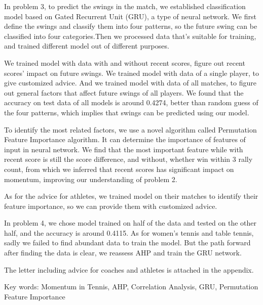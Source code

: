 In problem 3, to predict the swings in the match, we established classification model based on Gated Recurrent Unit (GRU),
a type of neural network.
We first define the swings and classify them into four patterns, so the future swing can be classified into
four categories.Then we processed data that's suitable for training, and trained different model out of different purposes.

We trained model with data with and without recent scores, figure out recent scores' impact on future swings.
We trained model with data of a single player, to give customized advice.
And we trained model with data of all matches, to figure out general factors that affect future swings of all players.
We found that the accuracy on test data of all models is around 0.4274, better than random guess of the four patterns,
which implies that swings can be predicted using our model.

To identify the most related factors, we use a novel algorithm called Permutation Feature Importance algorithm.
It can determine the importance of features of input in neural network. We find that the most important feature while
with recent score is still the score difference, and without, whether win within 3 rally count,
from which we inferred that recent scores has significant impact on momentum,
improving our understanding of problem 2.

As for the advice for athletes, we trained model on their matches to identify their feature importance,
so we can provide them with customized advice.

In problem 4, we chose model trained on half of the data and tested on the other half, and the accuracy is around 0.4115.
As for women's tennis and table tennis, sadly we failed to find abundant data to train the model.
But the path forward after finding the data is clear, we reassess AHP and train the GRU network.

The letter including advice for coaches and athletes is attached in the appendix.

Key words: Momentum in Tennis, AHP, Correlation Analysis, GRU, Permutation Feature Importance